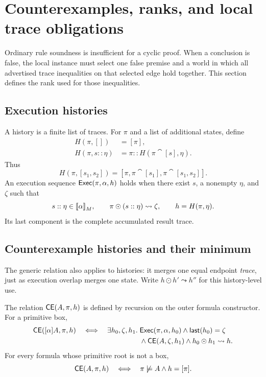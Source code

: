 \section{Counterexamples, ranks, and local trace obligations}\label{sec:progress}

Ordinary rule soundness is insufficient for a cyclic proof. When a conclusion
is false, the local instance must select one false premise and a world in
which all advertised trace inequalities on that selected edge hold together.
This section defines the rank used for those inequalities.

\subsection{Execution histories}
A history is a finite list of traces. For $\pi$ and a list of additional
states, define
\begin{align*}
 H(\pi,[])&=[\pi],\\
 H(\pi,s::\eta)&=\pi::H(\pi\cat[s],\eta).
\end{align*}
Thus
\[
 H(\pi,[s_1,s_2])=[\pi,\pi\cat[s_1],\pi\cat[s_1,s_2]].
\]
An execution sequence $\mathsf{Exec}(\pi,\alpha,h)$ holds when there exist
$s$, a nonempty $\eta$, and $\zeta$ such that
\[
 s::\eta\in\mathopen{[\![}\alpha\mathclose{]\!]}_M,\qquad
 \pi\odot(s::\eta)\leadsto\zeta,\qquad h=H(\pi,\eta).
\]
Its last component is the complete accumulated result trace.

\subsection{Counterexample histories and their minimum}
The generic relation  also applies to histories: it merges
one equal endpoint \emph{trace}, just as execution overlap merges one state.
Write $h\odot h'\leadsto h''$ for this history-level use.

\begin{definition}
The relation $\mathsf{CE}(A,\pi,h)$ is defined by recursion on the outer formula
constructor. For a primitive box,
\begin{align*}
 \mathsf{CE}([\alpha]A,\pi,h)\quad\Longleftrightarrow\quad
 \exists h_0,\zeta,h_1.\;&\mathsf{Exec}(\pi,\alpha,h_0)
   \land\mathsf{last}(h_0)=\zeta\\
   &{}\land\mathsf{CE}(A,\zeta,h_1)\land h_0\odot h_1\leadsto h.
\end{align*}
For every formula whose primitive root is not a box,
\[
 \mathsf{CE}(A,\pi,h)\quad\Longleftrightarrow\quad\pi\not\models A\land h=[\pi].
\]
\end{definition}

